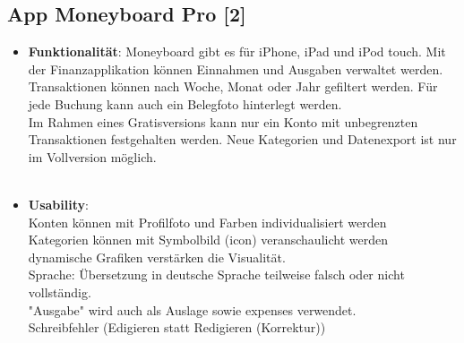 \documentclass[runningheads,a4paper]{llncs}
\begin{document}
\subsection{App Moneyboard Pro [2]}
\begin{itemize} 
\item \textbf{Funktionalität}: Moneyboard gibt es für iPhone, iPad und iPod touch. Mit der Finanzapplikation können Einnahmen und Ausgaben verwaltet werden. Transaktionen können nach Woche, Monat oder Jahr gefiltert werden.  Für jede Buchung kann auch ein Belegfoto hinterlegt werden. \\

Im Rahmen eines Gratisversions  kann nur ein Konto mit unbegrenzten Transaktionen festgehalten werden.  Neue Kategorien und Datenexport ist nur im Vollversion möglich.\\\\

\item \textbf{Usability}:\\

\textcolor{green}{}	Konten können mit Profilfoto und Farben individualisiert werden\\
\textcolor{green}{}	Kategorien können mit Symbolbild (icon) veranschaulicht werden\\
\textcolor{green}{}	dynamische Grafiken verstärken die Visualität.\\
\textcolor{red}{}	Sprache: Übersetzung in deutsche Sprache teilweise falsch oder nicht vollständig.\\
\textcolor{red}{}	"Ausgabe" wird auch als Auslage sowie expenses verwendet. \\
\textcolor{red}{}	Schreibfehler (Edigieren statt Redigieren (Korrektur))\\
\end{itemize}


\begin{figure}
\centering
{}
\end{figure}
\end{document}
